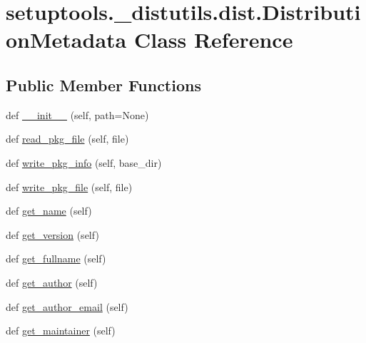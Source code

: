 \hypertarget{classsetuptools_1_1__distutils_1_1dist_1_1DistributionMetadata}{}\section{setuptools.\+\_\+distutils.\+dist.\+Distribution\+Metadata Class Reference}
\label{classsetuptools_1_1__distutils_1_1dist_1_1DistributionMetadata}
\subsection*{Public Member Functions}
\begin{DoxyCompactItemize}
\item 
def \hyperlink{classsetuptools_1_1__distutils_1_1dist_1_1DistributionMetadata_a107aafe4e36eee2b3912f6d78a042c01}{\+\_\+\+\_\+init\+\_\+\+\_\+} (self, path=None)
\item 
def \hyperlink{classsetuptools_1_1__distutils_1_1dist_1_1DistributionMetadata_accf5cd8961b4c252be35cca56dc483c8}{read\+\_\+pkg\+\_\+file} (self, file)
\item 
def \hyperlink{classsetuptools_1_1__distutils_1_1dist_1_1DistributionMetadata_a0991ae41b387cdfc66e684f1dcd7037f}{write\+\_\+pkg\+\_\+info} (self, base\+\_\+dir)
\item 
def \hyperlink{classsetuptools_1_1__distutils_1_1dist_1_1DistributionMetadata_a921d583635d0bc0574df79343e6ad60d}{write\+\_\+pkg\+\_\+file} (self, file)
\item 
def \hyperlink{classsetuptools_1_1__distutils_1_1dist_1_1DistributionMetadata_a1dd23cc04a2f2e53bf441f17922be532}{get\+\_\+name} (self)
\item 
def \hyperlink{classsetuptools_1_1__distutils_1_1dist_1_1DistributionMetadata_a597e6ec4b4ecae7e3a821754ec1ffc8d}{get\+\_\+version} (self)
\item 
def \hyperlink{classsetuptools_1_1__distutils_1_1dist_1_1DistributionMetadata_a9cdb297b27eb88d04a94e8d62bc1555c}{get\+\_\+fullname} (self)
\item 
def \hyperlink{classsetuptools_1_1__distutils_1_1dist_1_1DistributionMetadata_a6bd087d8e314bd28e83009d39ac44bc5}{get\+\_\+author} (self)
\item 
def \hyperlink{classsetuptools_1_1__distutils_1_1dist_1_1DistributionMetadata_ab7484f57ffbaf1570f0caa0db9f7b873}{get\+\_\+author\+\_\+email} (self)
\item 
def \hyperlink{classsetuptools_1_1__distutils_1_1dist_1_1DistributionMetadata_a27c1de9c36bbfc8e222c36495cad322a}{get\+\_\+maintainer} (self)

\end{DoxyCompactItemize}
